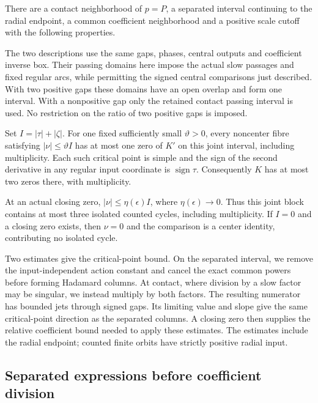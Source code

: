 \begin{proposition}\label{rw:joint-local}
There are a contact neighborhood of $p=P$, a separated interval
continuing to the radial endpoint, a common coefficient neighborhood
and a positive scale cutoff with the following properties.

The two descriptions use the same gaps, phases, central outputs
and coefficient inverse box. Their passing domains here impose the
actual slow passages and fixed regular arcs, while permitting the
signed central comparisons just described. With two positive gaps
these domains have an open overlap and form one interval. With
a nonpositive gap only the retained contact passing interval is used.
No restriction on the ratio of two positive gaps is imposed.

Set $I=|\tau|+|\zeta|$. For one fixed sufficiently small
$\vartheta>0$, every noncenter fibre satisfying
$|\nu|\le\vartheta I$ has at most one zero of $K'$ on this
joint interval, including multiplicity. Each such critical point is
simple and the sign of the second derivative in any regular input
coordinate is $\operatorname{sign}\tau$. Consequently $K$ has
at most two zeros there, with multiplicity.

At an actual closing zero,
$|\nu|\le\eta(\epsilon)I$, where $\eta(\epsilon)\to0$.
Thus this joint block contains at most three isolated counted
cycles, including multiplicity. If $I=0$ and a closing zero exists,
then $\nu=0$ and the comparison is a center identity, contributing
no isolated cycle.
\end{proposition}

Two estimates give the critical-point bound. On the separated interval,
we remove the input-independent action constant and cancel the exact
common powers before forming Hadamard columns. At contact, where division
by a slow factor may be singular, we instead multiply by both factors.
The resulting numerator has bounded jets through signed gaps. Its
limiting value and slope give the same critical-point direction as the
separated columns. A closing zero then supplies the relative coefficient
bound needed to apply these estimates. The estimates include the radial
endpoint; counted finite orbits have strictly positive radial input.

\subsection{Separated expressions before coefficient division}

